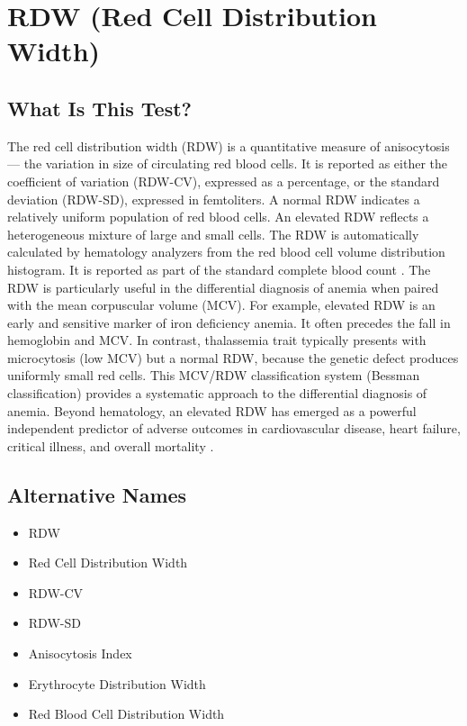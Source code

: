 \chapter{RDW (Red Cell Distribution Width)}

\section*{What Is This Test?}
The red cell distribution width (RDW) is a quantitative measure of anisocytosis --- the variation in size of circulating red blood cells. It is reported as either the coefficient of variation (RDW-CV), expressed as a percentage, or the standard deviation (RDW-SD), expressed in femtoliters. A normal RDW indicates a relatively uniform population of red blood cells. An elevated RDW reflects a heterogeneous mixture of large and small cells. The RDW is automatically calculated by hematology analyzers from the red blood cell volume distribution histogram. It is reported as part of the standard complete blood count \cite{tierney2023current}. The RDW is particularly useful in the differential diagnosis of anemia when paired with the mean corpuscular volume (MCV). For example, elevated RDW is an early and sensitive marker of iron deficiency anemia. It often precedes the fall in hemoglobin and MCV. In contrast, thalassemia trait typically presents with microcytosis (low MCV) but a normal RDW, because the genetic defect produces uniformly small red cells. This MCV/RDW classification system (Bessman classification) provides a systematic approach to the differential diagnosis of anemia. Beyond hematology, an elevated RDW has emerged as a powerful independent predictor of adverse outcomes in cardiovascular disease, heart failure, critical illness, and overall mortality \cite{lippi2014red}.

\section*{Alternative Names}
\begin{itemize}
  \item RDW
  \item Red Cell Distribution Width
  \item RDW-CV
  \item RDW-SD
  \item Anisocytosis Index
  \item Erythrocyte Distribution Width
  \item Red Blood Cell Distribution Width
\end{itemize}
